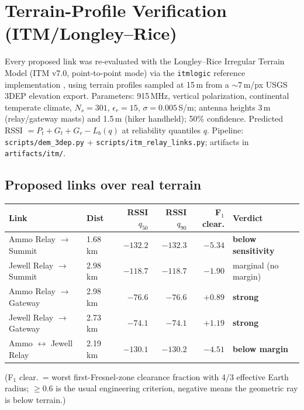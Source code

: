 \documentclass[11pt,letterpaper]{article}
\begin{document}
\section{Terrain-Profile Verification (ITM/Longley--Rice)}
\label{sec:itm}

Every proposed link was re-evaluated with the Longley--Rice Irregular Terrain Model
(ITM v7.0, point-to-point mode) via the \texttt{itmlogic} reference implementation
\cite{itmlogic2020}, using terrain profiles sampled at 15\,m from a $\sim$7\,m/px USGS
3DEP elevation export. Parameters: 915\,MHz, vertical polarization, continental
temperate climate, $N_s = 301$, $\epsilon_r = 15$, $\sigma = 0.005$\,S/m; antenna
heights 3\,m (relay/gateway masts) and 1.5\,m (hiker handheld); 50\% confidence.
Predicted RSSI $= P_t + G_t + G_r - L_b(q)$ at reliability quantiles $q$.
Pipeline: \texttt{scripts/dem\_3dep.py} + \texttt{scripts/itm\_relay\_links.py};
artifacts in \texttt{artifacts/itm/}.

\subsection{Proposed links over real terrain}

\begin{center}
\small
\begin{tabular}{@{}llrrrl@{}}
\toprule
\textbf{Link} & \textbf{Dist} & \textbf{RSSI $q_{50}$} & \textbf{RSSI $q_{90}$} &
\textbf{F$_1$ clear.} & \textbf{Verdict} \\
\midrule
Ammo Relay $\to$ Summit    & 1.68\,km & $-132.2$ & $-132.3$ & $-5.34$ & \textcolor{issured}{\textbf{below sensitivity}} \\
Jewell Relay $\to$ Summit  & 2.98\,km & $-118.7$ & $-118.7$ & $-1.90$ & \textcolor{issured}{marginal (no margin)} \\
Ammo Relay $\to$ Gateway   & 2.98\,km & $-76.6$  & $-76.6$  & $+0.89$ & \textcolor{okgreen}{\textbf{strong}} \\
Jewell Relay $\to$ Gateway & 2.73\,km & $-74.1$  & $-74.1$  & $+1.19$ & \textcolor{okgreen}{\textbf{strong}} \\
Ammo $\leftrightarrow$ Jewell Relay & 2.19\,km & $-130.1$ & $-130.2$ & $-4.51$ & \textcolor{issured}{\textbf{below margin}} \\
\bottomrule
\end{tabular}
\end{center}

\noindent (F$_1$ clear.\ = worst first-Fresnel-zone clearance fraction with 4/3
effective Earth radius; $\geq 0.6$ is the usual engineering criterion, negative means
the geometric ray is below terrain.)
\end{document}
